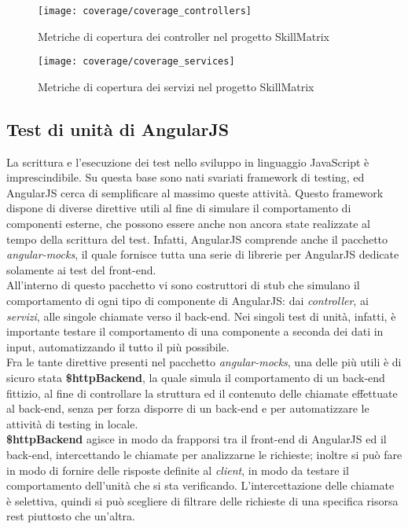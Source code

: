 \begin{figure}[!h] 
    \centering 
    \texttt{[image: coverage/coverage\_controllers]} 
    \caption{Metriche di copertura dei controller nel progetto SkillMatrix}
\end{figure}

\begin{figure}[!h] 
    \centering 
    \texttt{[image: coverage/coverage\_services]} 
    \caption{Metriche di copertura dei servizi nel progetto SkillMatrix}
\end{figure}

\subsection{Test di unità di AngularJS}
La scrittura e l'esecuzione dei test nello sviluppo in linguaggio JavaScript è imprescindibile. Su questa base sono nati svariati framework di testing, ed AngularJS cerca di semplificare al massimo queste attività. Questo framework dispone di diverse direttive utili al fine di simulare il comportamento di componenti esterne, che possono essere anche non ancora state realizzate al tempo della scrittura del test. Infatti, AngularJS comprende anche il pacchetto \emph{angular-mocks}, il quale fornisce tutta una serie di librerie per AngularJS dedicate solamente ai test del \gls{front-end}.\\
All'interno di questo pacchetto vi sono costruttori di \gls{stub} che simulano il comportamento di ogni tipo di componente di AngularJS: dai \emph{controller}, ai \emph{servizi}, alle singole chiamate verso il \gls{back-end}. Nei singoli test di unità, infatti, è importante testare il comportamento di una componente a seconda dei dati in input, automatizzando il tutto il più possibile.\\
Fra le tante direttive presenti nel pacchetto \emph{angular-mocks}, una delle più utili è di sicuro stata \textbf{\$httpBackend}, la quale simula il comportamento di un \gls{back-end} fittizio, al fine di controllare la struttura ed il contenuto delle chiamate effettuate al \gls{back-end}, senza per forza disporre di un \gls{back-end} e per automatizzare le attività di testing in locale.\\
\textbf{\$httpBackend} agisce in modo da frapporsi tra il \gls{front-end} di AngularJS ed il \gls{back-end}, intercettando le chiamate per analizzarne le richieste; inoltre si può fare in modo di fornire delle risposte definite al \emph{client}, in modo da testare il comportamento dell'unità che si sta verificando. L'intercettazione delle chiamate è selettiva, quindi si può scegliere di filtrare delle richieste di una specifica risorsa \gls{rest} piuttosto che un'altra.
